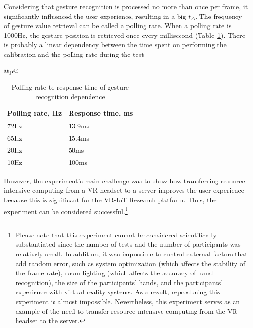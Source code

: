 Considering that gesture recognition is processed no more than once per frame, it significantly influenced the user experience, resulting in a big $t_{\Delta}$. The frequency of gesture value retrieval can be called a polling rate. When a polling rate is 1000Hz, the gesture position is retrieved once every millisecond (Table~\ref{tab:polling-rate-table}). There is probably a linear dependency between the time spent on performing the calibration and the polling rate during the test.

\begin{table}
\let\TPToverlap=\TPTrlap
  \centering
  \begin{threeparttable}[c]
    \caption{Polling rate to response time of gesture recognition dependence}
    \label{tab:polling-rate-table}
    \begin{tabular}{@{}p{\textwidth}@{}}
    \centering
    \begin{tabular}{ll}
      \toprule
      Polling rate, Hz    & Response time, ms                 \\
      \midrule
      72Hz & 13.9ms \\
      65Hz & 15.4ms \\
      20Hz & 50ms \\
      10Hz & 100ms \\
      \bottomrule
    \end{tabular}
    \end{tabular}
  \end{threeparttable}
\end{table}

However, the experiment's main challenge was to show how transferring resource-intensive computing from a VR headset to a server improves the user experience because this is significant for the VR-IoT Research platform. Thus, the experiment can be considered successful.\footnote{Please note that this experiment cannot be considered scientifically substantiated since the number of tests and the number of participants was relatively small. In addition, it was impossible to control external factors that add random error, such as system optimization (which affects the stability of the frame rate), room lighting (which affects the accuracy of hand recognition), the size of the participants' hands, and the participants' experience with virtual reality systems. As a result, reproducing this experiment is almost impossible. Nevertheless, this experiment serves as an example of the need to transfer resource-intensive computing from the VR headset to the server.}

